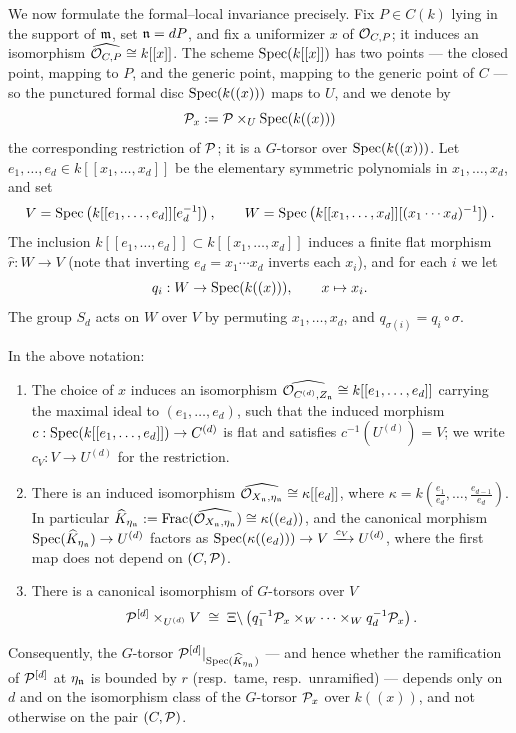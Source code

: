 We now formulate the formal--local invariance precisely. Fix $P \in C(k)$ lying in the support of $\mathfrak{m}$, set $\mathfrak{n} = dP$,
and fix a uniformizer $x$ of $\mathcal{O}_{C,P}$; it induces an isomorphism $\widehat{\mathcal{O}_{C,P}} \cong k[[x]]$.
The scheme $\operatorname{Spec}(k[[x]])$ has two points --- the closed point, mapping to $P$, and the generic point, mapping to the generic
point of $C$ --- so the punctured formal disc $\operatorname{Spec}(k((x)))$ maps to $U$, and we denote by
$$\mathcal{P}_x := \mathcal{P} \times_U \operatorname{Spec}(k((x)))$$
the corresponding restriction of $\mathcal{P}$; it is a $G$-torsor over $\operatorname{Spec}(k((x)))$.
Let $e_1, \dots, e_d \in k[[x_1, \dots, x_d]]$ be the elementary symmetric polynomials in $x_1, \dots, x_d$, and set
$$ V = \operatorname{Spec}\left(k[[e_1, \dots, e_d]][e_d^{-1}]\right), \qquad W = \operatorname{Spec}\left(k[[x_1, \dots, x_d]][(x_1 \cdots x_d)^{-1}]\right).$$
The inclusion $k[[e_1, \dots, e_d]] \subset k[[x_1, \dots, x_d]]$ induces a finite flat morphism $\hat{r}: W \to V$
(note that inverting $e_d = x_1 \cdots x_d$ inverts each $x_i$), and for each $i$ we let
$$ q_i : W \to \operatorname{Spec}(k((x))), \qquad x \mapsto x_i.$$
The group $S_d$ acts on $W$ over $V$ by permuting $x_1, \dots, x_d$, and $q_{\sigma(i)} = q_i \circ \sigma$.

\begin{lemma}\label{lemma:formal_local_invariance:reorg}
    In the above notation:
    \begin{enumerate}
        \item The choice of $x$ induces an isomorphism $\widehat{\mathcal{O}_{C^{(d)}, Z_{\mathfrak{n}}}} \cong k[[e_1, \dots, e_d]]$ carrying
        the maximal ideal to $(e_1, \dots, e_d)$, such that the induced morphism $c: \operatorname{Spec}(k[[e_1, \dots, e_d]]) \to C^{(d)}$
        is flat and satisfies $c^{-1}(U^{(d)}) = V$; we write $c_V : V \to U^{(d)}$ for the restriction.
        \item There is an induced isomorphism $\widehat{\mathcal{O}_{X_{\mathfrak{n}}, \eta_{\mathfrak{n}}}} \cong \kappa[[e_d]]$, where
        $\kappa = k(\frac{e_1}{e_d}, \dots, \frac{e_{d-1}}{e_d})$. In particular
        $\widehat{K}_{\eta_{\mathfrak{n}}} := \operatorname{Frac}(\widehat{\mathcal{O}_{X_{\mathfrak{n}}, \eta_{\mathfrak{n}}}}) \cong \kappa((e_d))$, and the canonical
        morphism $\operatorname{Spec}(\widehat{K}_{\eta_{\mathfrak{n}}}) \to U^{(d)}$ factors as
        $\operatorname{Spec}(\kappa((e_d))) \to V \xrightarrow{c_V} U^{(d)}$, where the first map does not depend on $(C, \mathcal{P})$.
        \item There is a canonical isomorphism of $G$-torsors over $V$
        $$ \mathcal{P}^{[d]} \times_{U^{(d)}} V \;\cong\; \Xi \backslash \left( q_1^{-1}\mathcal{P}_x \times_W \cdots \times_W q_d^{-1}\mathcal{P}_x \right).$$
    \end{enumerate}
    Consequently, the $G$-torsor $\mathcal{P}^{[d]}|_{\operatorname{Spec}(\widehat{K}_{\eta_{\mathfrak{n}}})}$ --- and hence whether the ramification of
    $\mathcal{P}^{[d]}$ at $\eta_{\mathfrak{n}}$ is bounded by $r$ (resp.\ tame, resp.\ unramified) --- depends only on $d$ and on the
    isomorphism class of the $G$-torsor $\mathcal{P}_x$ over $k((x))$, and not otherwise on the pair $(C, \mathcal{P})$.
\end{lemma}

